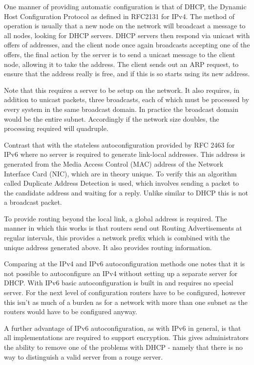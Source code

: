 \documentclass[a4paper,12pt]{article}
\begin{document}
One manner of providing automatic configuration is that of DHCP, the Dynamic
Host Configuration Protocol as defined in RFC2131 for IPv4. The method of
operation is usually that a new node on the network will broadcast a message to
all nodes, looking for DHCP servers. DHCP servers then respond via unicast with
offers of addresses, and the client node once again broadcasts accepting one of
the offers, the final action by the server is to send a unicast message to the
client node, allowing it to take the address. The client sends out an ARP
request, to ensure that the address really is free, and if this is so starts
using its new address.


Note that this requires a server to be setup on the network. It also requires,
in addition to unicast packets, three broadcasts, each of which must be
processed by every system in the same broadcast domain. In practice the
broadcast domain would be the entire subnet. Accordingly if the network size
doubles, the processing required will quadruple.


Contrast that with the stateless autoconfiguration provided by RFC 2463 for
IPv6 where no server is required to generate link-local addresses. This address
is generated from the Media Access Control (MAC) address of the Network
Interface Card (NIC), which are in theory unique. To verify this an algorithm called
Duplicate Address Detection is used, which involves sending a packet to the
candidate address and waiting for a reply. Unlike similar to DHCP this is not a
broadcast packet.


To provide routing beyond the local link, a global address is required. The
manner in which this works is that routers send out Routing Advertisements at
regular intervals, this provides a network prefix which is combined with the
unique address generated above. It also provides routing information.


Comparing at the IPv4 and IPv6 autoconfiguration methods one notes that it is
not possible to autoconfigure an IPv4 without setting up a separate server for
DHCP. With IPv6 basic autoconfiguration is built in and requires no special
server. For the next level of configuration routers have to be configured,
however this isn't as much of a burden as for a network with more than one
subnet as the routers would have to be configured anyway.


A further advantage of IPv6 autoconfiguration, as with IPv6 in general, is that
all implementations are required to support encryption. This gives
administrators the ability to remove one of the problems with DHCP - namely
that there is no way to distinguish a valid server from a rouge server.
\end{document}
